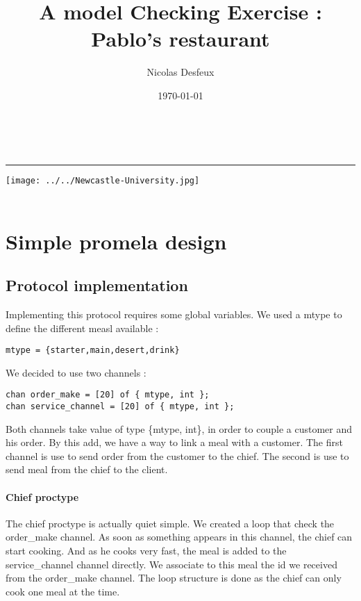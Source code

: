 \documentclass[a4paper,11pt]{article} %
\date{\today}
\author{Nicolas Desfeux}
\title{
{A model Checking Exercise : Pablo's restaurant
}}
\makeatletter
\def\maketitle{

	\begin{multicols}{2}
		{\begin{center}
		{\LARGE \@title}\\
		\rule{3cm}{1pt}
	\end{center}}
		\begin{flushright}
			{\texttt{[image: ../../Newcastle-University.jpg]}}\\
			{\@date}\\
		\end{flushright}
	\end{multicols}	
	\vspace{1cm}
}
\makeatother
\begin{document}
\maketitle
{}
\section{Simple promela design}
\subsection{Protocol implementation}
Implementing this protocol requires some global variables. 
We used a mtype to define the different measl available : 
\begin{lstlisting}
mtype = {starter,main,desert,drink}
\end{lstlisting}
 We decided to use two channels : 
\begin{lstlisting}
chan order_make = [20] of { mtype, int };
chan service_channel = [20] of { mtype, int };
\end{lstlisting}
Both channels take value of type \{mtype, int\}, in order to couple a customer and his order. By this add, we have a way to link a meal with a customer. The first channel is use to send order from the customer to the chief. The second is use to send meal from the chief to the client.
\paragraph{Chief proctype} The chief proctype is actually quiet simple. We created a loop that check the order\_make channel. As soon as something appears in this channel, the chief can start cooking. And as he cooks very fast, the meal is added to the service\_channel channel directly. We associate to this meal the id we received from the order\_make channel. The loop structure is done as the chief can only cook one meal at the time.
\end{document}
